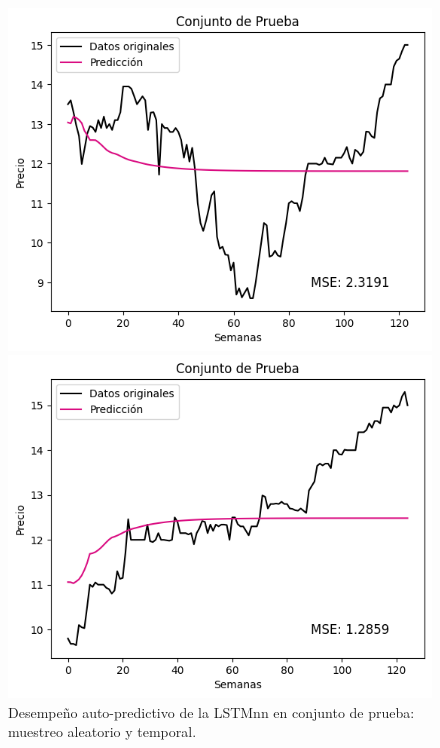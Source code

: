 \begin{figure}[H]
    \begin{minipage}{0.5\textwidth}
        \centering
        \includegraphics[width=\linewidth]{Figuras/proceso_de_entrenamiento/grafs_c_prueba/muestreo_aleatorio/LSTM/auto_predictiva/LSTM_v2.png}
    \end{minipage}
    \begin{minipage}{0.5\textwidth}
        \centering
        \includegraphics[width=\linewidth]{Figuras/proceso_de_entrenamiento/grafs_c_prueba/LSTM/auto_predictiva/LSTM_v2.png}
    \end{minipage}
    \caption{Desempeño auto-predictivo de la LSTMnn en conjunto de prueba: muestreo aleatorio y temporal.} 
    \label{fig:c_prueba_LSTM_autopred_v2}
\end{figure}


